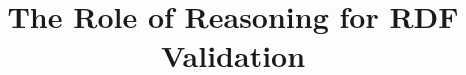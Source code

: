 \documentclass{acm_proc_article-sp}
\begin{document}
\title{The Role of Reasoning for RDF Validation}
%
%
%
%
%
\end{document}
